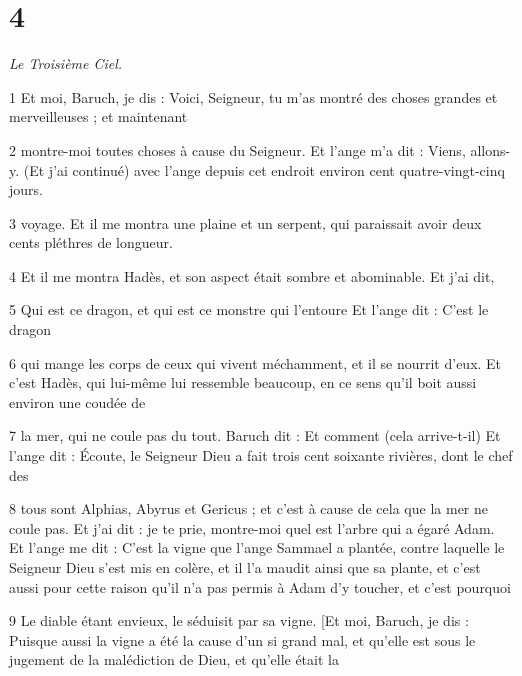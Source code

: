 \chapter{4}

\par \textit{Le Troisième Ciel.}

\par 1 Et moi, Baruch, je dis : Voici, Seigneur, tu m'as montré des choses grandes et merveilleuses ; et maintenant

\par 2 montre-moi toutes choses à cause du Seigneur. Et l'ange m'a dit : Viens, allons-y. (Et j'ai continué) avec l'ange depuis cet endroit environ cent quatre-vingt-cinq jours.

\par 3 voyage. Et il me montra une plaine et un serpent, qui paraissait avoir deux cents pléthres de longueur.

\par 4 Et il me montra Hadès, et son aspect était sombre et abominable. Et j'ai dit,

\par 5 Qui est ce dragon, et qui est ce monstre qui l'entoure Et l'ange dit : C'est le dragon

\par 6 qui mange les corps de ceux qui vivent méchamment, et il se nourrit d'eux. Et c'est Hadès, qui lui-même lui ressemble beaucoup, en ce sens qu'il boit aussi environ une coudée de

\par 7 la mer, qui ne coule pas du tout. Baruch dit : Et comment (cela arrive-t-il) Et l'ange dit : Écoute, le Seigneur Dieu a fait trois cent soixante rivières, dont le chef des

\par 8 tous sont Alphias, Abyrus et Gericus ; et c'est à cause de cela que la mer ne coule pas. Et j’ai dit : je te prie, montre-moi quel est l’arbre qui a égaré Adam. Et l'ange me dit : C'est la vigne que l'ange Sammael a plantée, contre laquelle le Seigneur Dieu s'est mis en colère, et il l'a maudit ainsi que sa plante, et c'est aussi pour cette raison qu'il n'a pas permis à Adam d'y toucher, et c'est pourquoi

\par 9 Le diable étant envieux, le séduisit par sa vigne. [Et moi, Baruch, je dis : Puisque aussi la vigne a été la cause d'un si grand mal, et qu'elle est sous le jugement de la malédiction de Dieu, et qu'elle était la

